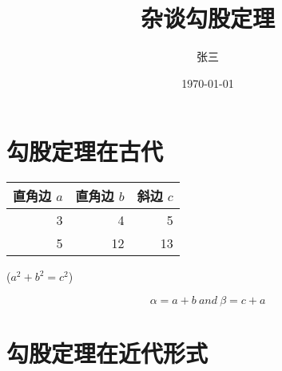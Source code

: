 \documentclass[UTF8]{ctexart}
\title{杂谈勾股定理}
\author{张三}
\date{\today}
\begin{document}
\maketitle
\newpage
\tableofcontents
\newpage
\section{勾股定理在古代}

\begin{table}[h]
    \begin{tabular}{|rrr|}
        \hline
        直角边 $a$ & 直角边 $b$ & 斜边 $c$ \\
        \hline
        3          & 4          & 5        \\
        5          & 12         & 13       \\
        \hline
    \end{tabular}%
    \qquad
    ($a^2 + b^2 = c^2$)
\end{table}

$$
    \alpha = a + b \  and \  \beta = c + a
$$

\section{勾股定理在近代形式}


\end{document}
